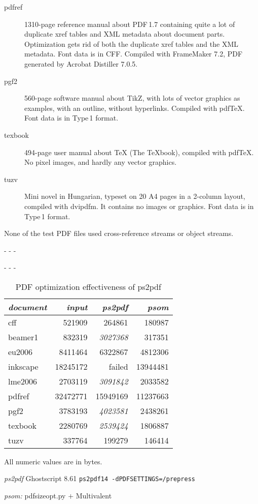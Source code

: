 \documentclass{ltugproc}
\def\cmd{\textsf}
\def\captiontop#1{%
  \advance\abovecaptionskip-\belowcaptionskip
  \advance\belowcaptionskip\abovecaptionskip
  \advance\abovecaptionskip-\belowcaptionskip
  \abovecaptionskip-\abovecaptionskip
  \caption{#1}%
  \advance\abovecaptionskip-\belowcaptionskip
  \advance\belowcaptionskip\abovecaptionskip
  \advance\abovecaptionskip-\belowcaptionskip
  \abovecaptionskip-\abovecaptionskip
}
\begin{document}
\begin{description}
\item[pdfref] 1310-page reference manual about PDF\,1.7 containing quite a
lot of duplicate xref tables and XML metadata about document parts.
Optimization gets rid of both the duplicate xref tables and the XML
metadata. Font data is in CFF. Compiled with FrameMaker 7.2, PDF generated
by Acrobat Distiller 7.0.5.

\item[pgf2] 560-page software manual about TikZ, with lots of vector
graphics as examples, with an outline, without hyperlinks. Compiled with
pdf\TeX{}. Font data is in Type\,1 format.

\item[texbook] 494-page user manual about \TeX{} (The \TeX{}book), compiled
with pdf\TeX{}. No pixel images, and hardly any vector graphics.

\item[tuzv] Mini novel in Hungarian, typeset on 20 A4 pages in a 2-column
layout, compiled with \cmd{dvipdfm}. It contains no images or graphics. Font data
is in Type\,1 format.

\end{description}

\noindent None of the test PDF files used cross-reference streams or object streams.


\begin{table}
\captiontop{PDF optimization effectiveness
of \cmd{ps2pdf}}\label{tab:eff-ps2pdf}
\par\small\noindent\hfil
\begin{tabular*}{\hsize}{@{\extracolsep{\fill}}lrrr@{}}
\toprule
\emph{document} & \emph{input} & \emph{ps2pdf} & \emph{psom} \\\midrule
cff         &   521909 &   264861 &   180987 \\
beamer1     &   832319 &  \emph{3027368} &   317351 \\
eu2006      &  8411464 &  6322867 &  4812306 \\
inkscape    & 18245172 &  failed  & 13944481 \\
lme2006     &  2703119 &  \emph{3091842} &  2033582 \\
pdfref      & 32472771 & 15949169 & 11237663 \\
pgf2        &  3783193 &  \emph{4023581} &  2438261 \\
texbook     &  2280769 &  \emph{2539424} &  1806887 \\
tuzv        &   337764 &   199279 &   146414 \\
\bottomrule
\end{tabular*}
\par\bigskip
\par\noindent All numeric values are in bytes.
\par\noindent\emph{ps2pdf} Ghostscript 8.61 \texttt{ps2pdf14 -dPDFSETTINGS=/prepress}
\par\noindent\emph{psom:} \cmd{pdfsizeopt.py} $+$ Multivalent
\end{table}
\end{document}
